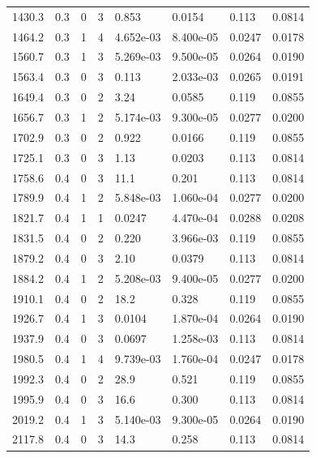 \documentclass[preview]{standalone}
\begin{document}
{{{\begin{tabular}{L{1.2cm}C{1.2cm} C{0.3cm}C{0.5cm} C{1.4cm}C{1.4cm} C{1.4cm}C{1.4cm}}
  1430.3  &   0.3  & 0     &  3 &  0.853  & 0.0154  & 0.113 &  0.0814   \\ 
  1464.2  &   0.3  & 1     &  4 &  4.652e-03  & 8.400e-05  & 0.0247 &  0.0178   \\ 
  1560.7  &   0.3  & 1     &  3 &  5.269e-03  & 9.500e-05  & 0.0264 &  0.0190   \\ 
  1563.4  &   0.3  & 0     &  3 &  0.113  & 2.033e-03  & 0.0265 &  0.0191   \\ 
  1649.4  &   0.3  & 0     &  2 &  3.24  & 0.0585  & 0.119 &  0.0855   \\ 
  1656.7  &   0.3  & 1     &  2 &  5.174e-03  & 9.300e-05  & 0.0277 &  0.0200   \\ 
  1702.9  &   0.3  & 0     &  2 &  0.922  & 0.0166  & 0.119 &  0.0855   \\ 
  1725.1  &   0.3  & 0     &  3 &  1.13  & 0.0203  & 0.113 &  0.0814   \\ 
  1758.6  &   0.4  & 0     &  3 &  11.1  & 0.201  & 0.113 &  0.0814   \\ 
  1789.9  &   0.4  & 1     &  2 &  5.848e-03  & 1.060e-04  & 0.0277 &  0.0200   \\ 
  1821.7  &   0.4  & 1     &  1 &  0.0247  & 4.470e-04  & 0.0288 &  0.0208   \\ 
  1831.5  &   0.4  & 0     &  2 &  0.220  & 3.966e-03  & 0.119 &  0.0855   \\ 
  1879.2  &   0.4  & 0     &  3 &  2.10  & 0.0379  & 0.113 &  0.0814   \\ 
  1884.2  &   0.4  & 1     &  2 &  5.208e-03  & 9.400e-05  & 0.0277 &  0.0200   \\ 
  1910.1  &   0.4  & 0     &  2 &  18.2  & 0.328  & 0.119 &  0.0855   \\ 
  1926.7  &   0.4  & 1     &  3 &  0.0104  & 1.870e-04  & 0.0264 &  0.0190   \\ 
  1937.9  &   0.4  & 0     &  3 &  0.0697  & 1.258e-03  & 0.113 &  0.0814   \\ 
  1980.5  &   0.4  & 1     &  4 &  9.739e-03  & 1.760e-04  & 0.0247 &  0.0178   \\ 
  1992.3  &   0.4  & 0     &  2 &  28.9  & 0.521  & 0.119 &  0.0855   \\ 
  1995.9  &   0.4  & 0     &  3 &  16.6  & 0.300  & 0.113 &  0.0814   \\ 
  2019.2  &   0.4  & 1     &  3 &  5.140e-03  & 9.300e-05  & 0.0264 &  0.0190   \\ 
  2117.8  &   0.4  & 0     &  3 &  14.3  & 0.258  & 0.113 &  0.0814   \\ 

\end{tabular}}}}
\end{document}
